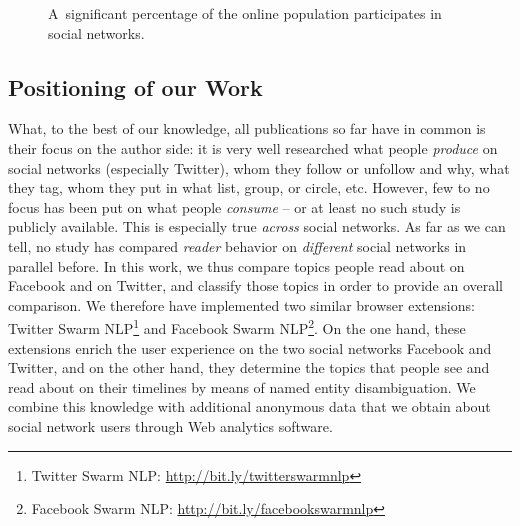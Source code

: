 \documentclass{iosart2c}
\begin{document}
\begin{figure}
  \centering
    \qquad
\caption{A~significant percentage of the online population participates in social networks.}
\label{fig:globalmarkets}
\end{figure}

\subsection{Positioning of our Work}
What, to the best of our knowledge, all publications so far have in common is their focus on the author side: it is very well researched what people \emph{produce} on social networks (especially Twitter), whom they follow or unfollow and why, what they tag, whom they put in what list, group, or circle, etc.
However, few to no focus has been put on what people \emph{consume} -- or at least no such study is publicly available.
This is especially true \emph{across} social networks.
As far as we can tell, no study has compared \emph{reader} behavior on \emph{different} social networks in parallel before.
In this work, we thus compare topics people read about on Facebook and on Twitter, and classify those topics in order to provide an overall comparison. 
We therefore have implemented two similar browser extensions: Twitter Swarm NLP\footnote{Twitter Swarm NLP: \url{http://bit.ly/twitterswarmnlp}} and Facebook Swarm NLP\footnote{Facebook Swarm NLP: \url{http://bit.ly/facebookswarmnlp}}. 
On the one hand, these extensions enrich the user experience on the two social networks Facebook and Twitter, and on the other hand, they determine the topics that people see and read about on their timelines by means of named entity disambiguation.
We combine this knowledge with additional anonymous data that we obtain about social network users through Web analytics software.
\end{document}
